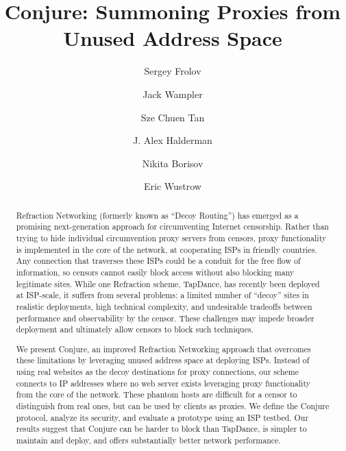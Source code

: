 \documentclass[sigconf]{acmart}
\begin{document}
\fancyhead{} %

\title{Conjure: Summoning Proxies from Unused Address Space}

\author{Sergey Frolov}
\author{Jack Wampler}
\author{Sze Chuen Tan}
\author{J. Alex Halderman}
\author{Nikita Borisov}
\author{Eric Wustrow}

\newcommand{\scheme}{Conjure\xspace}

\begin{abstract}
Refraction Networking (formerly known as ``Decoy Routing'') has
emerged as a promising next-generation approach for circumventing
Internet censorship. Rather than trying to hide individual
circumvention proxy servers from censors, proxy functionality is
implemented in the core of the network, at cooperating ISPs in
friendly countries. Any connection that traverses these ISPs could be
a conduit for the free flow of information, so censors cannot easily
block access without also blocking many legitimate sites.  While one
Refraction scheme, TapDance, has recently been deployed at ISP-scale,
it suffers from several problems: a limited number of ``decoy'' sites
in realistic deployments, high technical complexity, and undesirable
tradeoffs between performance and observability by the censor. These
challenges may impede broader deployment and ultimately allow censors to
block such techniques.

We present \scheme, an improved Refraction Networking approach
that overcomes these limitations by leveraging unused address space at
deploying ISPs. Instead of using real websites as the decoy destinations
for proxy connections, our scheme connects to IP addresses where no 
web server exists leveraging proxy functionality from the core of the network.
These phantom hosts are difficult for a censor to distinguish from
real ones, but can be used by clients as proxies.  We define the
\scheme protocol, analyze its security, and evaluate a
prototype using an ISP testbed.
Our results suggest that \scheme can be harder to block
than TapDance, is simpler to maintain and deploy,
and offers substantially better network performance.

\end{abstract}
\end{document}
